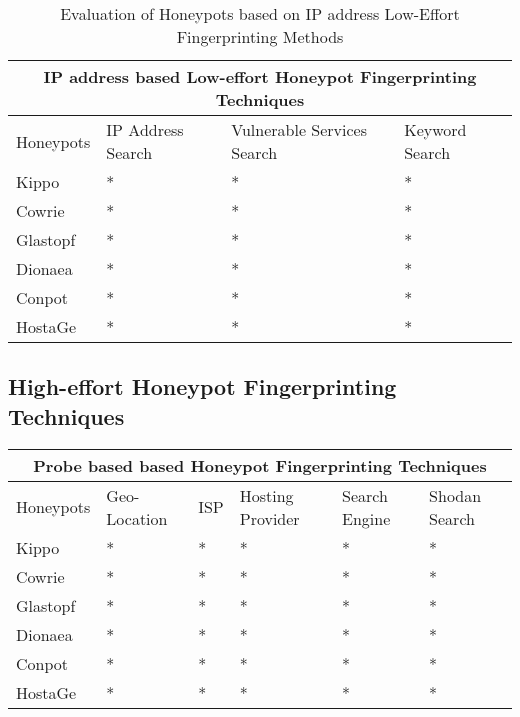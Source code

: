\documentclass[../main.tex]{subfiles}
\begin{document}
 \begin{table}[]
    
 
 \begin{tabular}{ |p{1.5cm}||p{1.5cm}||p{1.2cm}|p{0.4cm}| }
 \hline
 \multicolumn{4}{|c|}{IP address based Low-effort Honeypot Fingerprinting Techniques} \\
 \hline
 Honeypots & IP Address Search & Vulnerable Services Search & Keyword Search \\
 \hline
 Kippo   & *  &* & *  \\
 Cowrie  & *  &* & *  \\
 Glastopf& *  &* & *  \\
 Dionaea & *  &* & *  \\
 Conpot  & *  &* & *  \\
 HostaGe & *  &*  &  *  \\
 \hline
\end{tabular}
 \caption{Evaluation of Honeypots based on IP address Low-Effort Fingerprinting Methods}
 \label{Tab:IP address}
 \end{table}


\subsection{High-effort Honeypot Fingerprinting Techniques}



\begin{tabular}{ |p{1.5cm}||p{1.2cm}|p{0.4cm}|p{1.2cm}|p{1.2cm}|p{1.2cm}| }
 \hline
 \multicolumn{6}{|c|}{Probe based based Honeypot Fingerprinting Techniques} \\
 \hline
 Honeypots & Geo-Location & ISP & Hosting Provider & Search Engine & Shodan Search\\
 \hline
 Kippo   & *  &* & * & * & * \\
 Cowrie  & *  &* & * & * & * \\
 Glastopf& *  &* & * & * & * \\
 Dionaea & *  &* & * & * & * \\
 Conpot  & *  &* & * & * & * \\
 HostaGe & *  &* & * & * & * \\
 \hline
\end{tabular}
\end{document}
